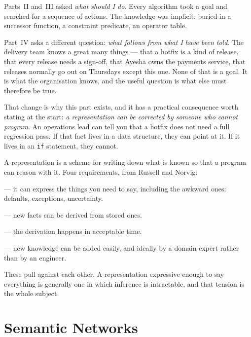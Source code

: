 Parts~II and~III asked \emph{what should I do}. Every algorithm took a goal and
searched for a sequence of actions. The knowledge was implicit: buried in a
successor function, a constraint predicate, an operator table.

Part~IV asks a different question: \emph{what follows from what I have been told}.
The delivery team knows a great many things --- that a hotfix is a kind of release,
that every release needs a sign-off, that Ayesha owns the payments service, that
releases normally go out on Thursdays except this one. None of that is a goal. It
is what the organisation knows, and the useful question is what else must therefore
be true.

That change is why this part exists, and it has a practical consequence worth
stating at the start: \emph{a representation can be corrected by someone who cannot
program}. An operations lead can tell you that a hotfix does not need a full
regression pass. If that fact lives in a data structure, they can point at it. If it
lives in an \texttt{if} statement, they cannot.

\begin{definitionbox}
A representation is a scheme for writing down what is known so that a program can
reason with it. Four requirements, from Russell and Norvig:
\begin{tight}
  \item {} --- it can express the things you need to
        say, including the awkward ones: defaults, exceptions, uncertainty.
  \item {} --- new facts can be derived from stored ones.
  \item {} --- the derivation happens in acceptable
        time.
  \item {} --- new knowledge can be added easily, and
        ideally by a domain expert rather than by an engineer.
\end{tight}
These pull against each other. A representation expressive enough to say everything
is generally one in which inference is intractable, and that tension is the whole
subject.
\end{definitionbox}

\section{Semantic Networks}

